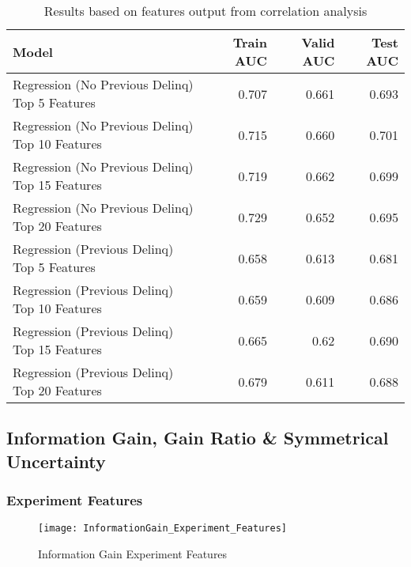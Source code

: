 \begin{table}[H]
	\centering
	\resizebox{\textwidth}{!}
	{
	\begin{tabular}{l | r | r| r}
		\hline
		\textbf{Model} & \textbf{Train AUC} & \textbf{Valid AUC} &  \textbf{Test AUC} \\
		\hline
		Regression (No Previous Delinq) Top 5 Features & 0.707 & 0.661 & 0.693  \\
		Regression (No Previous Delinq) Top 10 Features & 0.715 & 0.660 & 0.701  \\
		 \cellcolor{green!25}Regression (No Previous Delinq) Top 15 Features &  \cellcolor{green!25}0.719 &  \cellcolor{green!25}0.662 &  \cellcolor{green!25}0.699  \\
		Regression (No Previous Delinq) Top 20 Features & 0.729 & 0.652 & 0.695  \\
		\hline
		Regression (Previous Delinq) Top 5 Features & 0.658 & 0.613 & 0.681  \\
		Regression (Previous Delinq) Top 10 Features & 0.659 & 0.609 & 0.686  \\
		 \cellcolor{green!25}Regression (Previous Delinq) Top 15 Features &  \cellcolor{green!25}0.665 &  \cellcolor{green!25}0.62 &  \cellcolor{green!25}0.690  \\
		Regression (Previous Delinq) Top 20 Features & 0.679 & 0.611 & 0.688  \\	
		\hline
	\end{tabular}
	}
	\caption{Results based on features output from correlation analysis}
	\label{table:featureselection_base_model}
\end{table}

\subsection{Information Gain, Gain Ratio \& Symmetrical Uncertainty}

\subsubsection{Experiment Features}

\begin{figure}[H]
	\texttt{[image: InformationGain\_Experiment\_Features]}
	\caption{Information Gain Experiment Features}
	\label{fig:Information Gain Experiment Features}
\end{figure}

